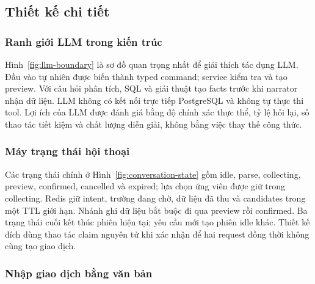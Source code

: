 \subsection{Thiết kế chi tiết}

\subsubsection{Ranh giới LLM trong kiến trúc}


Hình~\ref{fig:llm-boundary} là sơ đồ quan trọng nhất để giải thích tác dụng LLM. Đầu vào tự nhiên được biến thành typed command; service kiểm tra và tạo preview. Với câu hỏi phân tích, SQL và giải thuật tạo facts trước khi narrator nhận dữ liệu. LLM không có kết nối trực tiếp PostgreSQL và không tự thực thi tool. Lợi ích của LLM được đánh giá bằng độ chính xác thực thể, tỷ lệ hỏi lại, số thao tác tiết kiệm và chất lượng diễn giải, không bằng việc thay thế công thức.

\subsubsection{Máy trạng thái hội thoại}


Các trạng thái chính ở Hình~\ref{fig:conversation-state} gồm idle, parse, collecting, preview, confirmed, cancelled và expired; lựa chọn ứng viên được giữ trong collecting. Redis giữ intent, trường đang chờ, dữ liệu đã thu và candidates trong một TTL giới hạn. Nhánh ghi dữ liệu bắt buộc đi qua preview rồi confirmed. Ba trạng thái cuối kết thúc phiên hiện tại; yêu cầu mới tạo phiên idle khác. Thiết kế đích dùng thao tác claim nguyên tử khi xác nhận để hai request đồng thời không cùng tạo giao dịch.

\subsubsection{Nhập giao dịch bằng văn bản}



